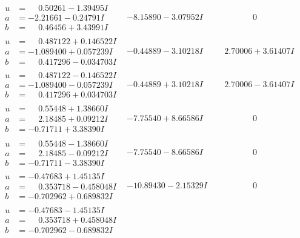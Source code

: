 \documentclass[1p]{elsarticle_modified}
\theoremstyle{definition}
\begin{document}
$$\begin{array}{c|c|c}
\begin{aligned}
u &= \phantom{-}0.50261 - 1.39495 I \\
a &= -2.21661 - 0.24791 I \\
b &= \phantom{-}0.46456 + 3.43991 I\end{aligned}
 & -8.15890 - 3.07952 I & \phantom{-0.000000 } 0 \\ \hline\begin{aligned}
u &= \phantom{-}0.487122 + 0.146522 I \\
a &= -1.089400 + 0.057239 I \\
b &= \phantom{-}0.417296 - 0.034703 I\end{aligned}
 & -0.44889 - 3.10218 I & \phantom{-}2.70006 + 3.61407 I \\ \hline\begin{aligned}
u &= \phantom{-}0.487122 - 0.146522 I \\
a &= -1.089400 - 0.057239 I \\
b &= \phantom{-}0.417296 + 0.034703 I\end{aligned}
 & -0.44889 + 3.10218 I & \phantom{-}2.70006 - 3.61407 I \\ \hline\begin{aligned}
u &= \phantom{-}0.55448 + 1.38660 I \\
a &= \phantom{-}2.18485 + 0.09212 I \\
b &= -0.71711 + 3.38390 I\end{aligned}
 & -7.75540 + 8.66586 I & \phantom{-0.000000 } 0 \\ \hline\begin{aligned}
u &= \phantom{-}0.55448 - 1.38660 I \\
a &= \phantom{-}2.18485 - 0.09212 I \\
b &= -0.71711 - 3.38390 I\end{aligned}
 & -7.75540 - 8.66586 I & \phantom{-0.000000 } 0 \\ \hline\begin{aligned}
u &= -0.47683 + 1.45135 I \\
a &= \phantom{-}0.353718 - 0.458048 I \\
b &= -0.702962 + 0.689832 I\end{aligned}
 & -10.89430 - 2.15329 I & \phantom{-0.000000 } 0 \\ \hline\begin{aligned}
u &= -0.47683 - 1.45135 I \\
a &= \phantom{-}0.353718 + 0.458048 I \\
b &= -0.702962 - 0.689832 I\end{aligned}

\end{array}$$
\end{document}
